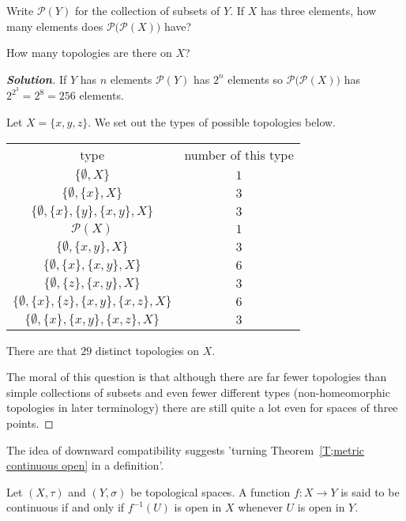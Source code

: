 \begin{theorem}\label{T;silly count} 
Write ${\mathcal P}(Y)$ for the collection
of subsets of $Y$. If $X$ has three elements, how many
elements does ${\mathcal P}\big({\mathcal P}(X)\big)$
have?

How many topologies are there on $X$?
\end{theorem}
\begin{proof}[\bf Solution] 
If $Y$ has $n$ elements ${\mathcal P}(Y)$ has $2^{n}$
elements so ${\mathcal P}\big({\mathcal P}(X)\big)$ 
has $2^{2^{3}}=2^{8}=256$ elements.

Let $X=\{x,y,z\}$. We set out the types of possible
topologies below.
\begin{center}
\begin{tabular}{c|c}
type&number of this type\\
$\{\emptyset,X\}$&$1$\\
$\{\emptyset,\{x\},X\}$&$3$\\
$\{\emptyset,\{x\},\{y\},\{x,y\},X\}$&$3$\\
${\mathcal P}(X)$&$1$\\
$\{\emptyset,\{x,y\},X\}$&$3$\\
$\{\emptyset,\{x\},\{x,y\},X\}$&$6$\\
$\{\emptyset,\{z\},\{x,y\},X\}$&$3$\\
$\{\emptyset,\{x\},\{z\},\{x,y\},\{x,z\},X\}$&$6$\\
$\{\emptyset,\{x\},\{x,y\},\{x,z\},X\}$&$3$
\end{tabular}
\end{center}

There are that $29$ distinct topologies on $X$.

The moral of this question is that although there are far
fewer topologies than simple collections of subsets
and even fewer different types (non-homeomorphic
topologies in later terminology) there are still
quite a lot even for spaces of three points.
\end{proof}

The idea of downward compatibility suggests 'turning Theorem~\ref{T;metric continuous open} in a definition'.

\begin{definition}\label{D;topological continuity}
Let $(X,\tau)$ and $(Y,\sigma)$ be topological spaces.
A function $f:X\rightarrow Y$ is said to be continuous if and only
if $f^{-1}(U)$ is open in $X$ whenever $U$ is open in $Y$.
\end{definition}

